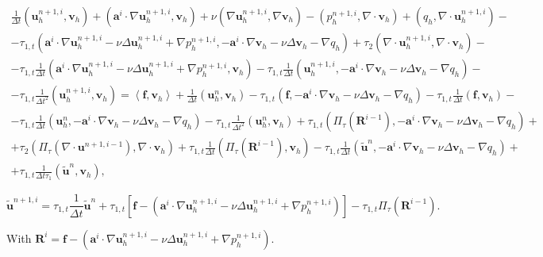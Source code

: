 \begin{eqnarray}
\label{14}
\frac{1}{\Delta t}(\mathbf{u}_h^{n+1,i},\mathbf{v}_h)+(\mathbf{a}^i\cdot\nabla\mathbf{u}_h^{n+1,i},\mathbf{v}_h)+\nu(\nabla\mathbf{u}_h^{n+1,i},\nabla\mathbf{v}_h)-(p_h^{n+1,i},\nabla\cdot\mathbf{v}_h)+(q_h,\nabla\cdot\mathbf{u}_h^{n+1,i})-\\\nonumber
-\tau_{1,t}(\mathbf{a}^i\cdot\nabla\mathbf{u}_h^{n+1,i}-\nu\Delta\mathbf{u}_h^{n+1,i}+\nabla p_h^{n+1,i},-\mathbf{a}^i\cdot\nabla\mathbf{v}_h-\nu\Delta\mathbf{v}_h-\nabla q_h)+\tau_2(\nabla\cdot\mathbf{u}_h^{n+1,i},\nabla\cdot\mathbf{v}_h)-\\\nonumber
-\tau_{1,t}\frac{1}{\Delta t}(\mathbf{a}^i\cdot\nabla\mathbf{u}_h^{n+1,i}-\nu\Delta\mathbf{u}_h^{n+1,i}+\nabla p_h^{n+1,i},\mathbf{v}_h)-\tau_{1,t}\frac{1}{\Delta t}(\mathbf{u}_h^{n+1,i},-\mathbf{a}^i\cdot\nabla\mathbf{v}_h-\nu\Delta\mathbf{v}_h-\nabla q_h)-\\\nonumber
-\tau_{1,t}\frac{1}{\Delta t^2}(\mathbf{u}_h^{n+1,i},\mathbf{v}_h)=\left<\mathbf{f},\mathbf{v}_h\right>+\frac{1}{\Delta t}(\mathbf{u}_h^n,\mathbf{v}_h)-\tau_{1,t}(\mathbf{f},-\mathbf{a}^i\cdot\nabla\mathbf{v}_h-\nu\Delta\mathbf{v}_h-\nabla q_h)-\tau_{1,t}\frac{1}{\Delta t}(\mathbf{f},\mathbf{v}_h)-\\\nonumber
-\tau_{1,t}\frac{1}{\Delta t}(\mathbf{u}_h^n,-\mathbf{a}^i\cdot\nabla\mathbf{v}_h-\nu\Delta\mathbf{v}_h-\nabla q_h)-\tau_{1,t}\frac{1}{\Delta t^2}(\mathbf{u}_h^n,\mathbf{v}_h)+\tau_{1,t}(\Pi_\tau(\mathbf{R}^{i-1}),-\mathbf{a}^i\cdot\nabla\mathbf{v}_h-\nu\Delta\mathbf{v}_h-\nabla q_h)+\\\nonumber
+\tau_2(\Pi_\tau(\nabla\cdot\mathbf{u}^{n+1,i-1}),\nabla\cdot\mathbf{v}_h)+\tau_{1,t}\frac{1}{\Delta t}(\Pi_\tau(\mathbf{R}^{i-1}),\mathbf{v}_h)-\tau_{1,t}\frac{1}{\Delta t}(\tilde{\mathbf{u}}^n,-\mathbf{a}^i\cdot\nabla\mathbf{v}_h-\nu\Delta\mathbf{v}_h-\nabla q_h)+\\\nonumber
+\tau_{1,t}\frac{1}{\Delta t\tau_1}(\tilde{\mathbf{u}}^n,\mathbf{v}_h),
\end{eqnarray}

\begin{equation}
\label{15}
\tilde{\mathbf{u}}^{n+1,i}=\tau_{1,t}\frac{1}{\Delta t}\tilde{\mathbf{u}}^n+\tau_{1,t}\left[\mathbf{f}-(\mathbf{a}^i\cdot\nabla\mathbf{u}_h^{n+1,i}-\nu\Delta\mathbf{u}_h^{n+1,i}+\nabla p_h^{n+1,i})\right]-\tau_{1,t}\Pi_\tau(\mathbf{R}^{i-1}).
\end{equation}

With $ \mathbf{R}^i=\mathbf{f}-(\mathbf{a}^i\cdot\nabla\mathbf{u}_h^{n+1,i}-\nu\Delta\mathbf{u}_h^{n+1,i}+\nabla p_h^{n+1,i})$.


